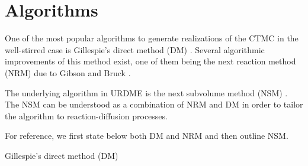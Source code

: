 \section{Algorithms}
\label{app:algorithms}

One of the most popular algorithms to generate realizations of the
CTMC in the well-stirred case is Gillespie's direct method (DM)
\cite{SSA}. Several algorithmic improvements of this method exist,
one of them being the next reaction method (NRM) due to Gibson and
Bruck \cite{NRM}.

The underlying algorithm in URDME is the next subvolume method (NSM)
\cite{BISTAB}. The NSM can be understood as a combination of NRM and
DM in order to tailor the algorithm to reaction-diffusion processes.

For reference, we first state below both DM and NRM and then outline
NSM.

\begin{algorithm}[htb!]
\caption{Gillespie's direct method (DM)}
\begin{algorithmic}



  


  \ENDWHILE

\end{algorithmic}
\label{alg:SSADM}
\end{algorithm}

